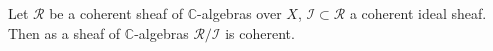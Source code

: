 Let $\mathcal{R}$ be a coherent sheaf of $\mathbb{C}$-algebras over $X$, $\mathcal{I} \subset \mathcal{R}$ a coherent ideal sheaf. Then as a sheaf of $\mathbb{C}$-algebras $\mathcal{R}/\mathcal{I}$ is coherent.
